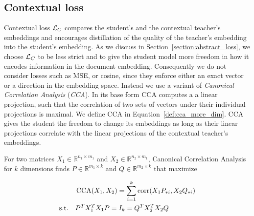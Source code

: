 
\subsection{Contextual loss}\label{section:contextual_loss}

Contextual loss $\mathcal{L}_C$ compares the student's and the contextual teacher's
embeddings and encourages distillation of the quality of the teacher's
embedding into the student's embedding. As we discuss in
Section~\ref{section:abstract_loss}, we choose $\mathcal{L}_C$ to be less strict and
to give the student model more freedom in how it encodes information in the
document embedding. Consequently we do not consider losses such as MSE, or
cosine, since they enforce either an exact vector or a direction in the
embedding space. Instead we use a variant of \emph{Canonical Correlation
Analysis} \citep{hotelling1992relations} (\emph{CCA}). In its base form CCA
computes a a linear projection, such that the correlation of two sets of
vectors under their individual projections is maximal. We define CCA in
Equation~\ref{def:cca_more_dim}. CCA gives the student the freedom to change
its embeddings as long as their linear projections correlate with the linear
projections of the contextual teacher's embeddings.

\begin{defn}\label{def:cca_more_dim}

  For two matrices $X_1 \in \mathbb{R}^{n_1 \times m_1}$ and $X_2 \in
  \mathbb{R}^{n_2 \times m_1}$, Canonical Correlation Analysis for $k$
  dimensions finds $P \in \mathbb{R}^{m_1 \times k}$ and $Q \in \mathbb{R}^{m_2
  \times k}$ that maximize

  \begin{equation}
    \begin{split}
      &\operatorname*{CCA}(X_1, X_2) = \sum_{i = 1}^k \operatorname*{corr}(X_1P_{*i}, X_2Q_{*i}) \\
      \text{s.t.}\quad &P^TX_1^TX_1P = I_k = Q^TX_2^TX_2Q \\
    \end{split}
  \end{equation}


\end{defn}

